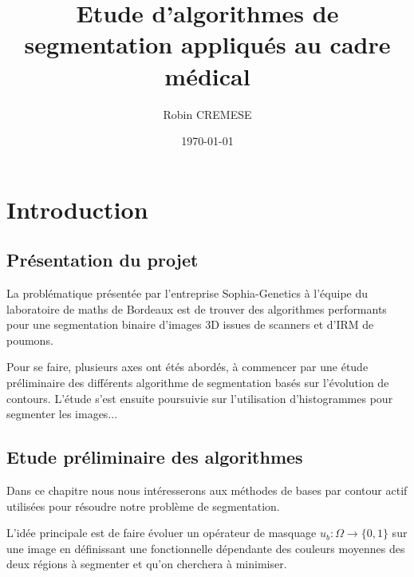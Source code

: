 \documentclass{report}
\title{Etude d'algorithmes de segmentation appliqués au cadre médical}
\author{Robin CREMESE}
\date{\today}
\begin{document}
\layout
\part{Introduction}
\label{P-Introduction}
\chapter{Présentation du projet}
\label{C-Présentation du projet}
La problématique présentée par l'entreprise Sophia-Genetics à l'équipe du laboratoire de maths de Bordeaux est de trouver des algorithmes performants pour une segmentation binaire d'images 3D issues de scanners et d'IRM de poumons.

Pour se faire, plusieurs axes ont étés abordés, à commencer par une étude préliminaire des différents  algorithme de segmentation basés sur l'évolution de contours. L'étude s'est ensuite poursuivie sur l'utilisation d'histogrammes pour segmenter les images...

\chapter{Etude préliminaire des algorithmes}
\label{C-Etude préliminaire des algorithmes}
Dans ce chapitre nous nous intéresserons aux méthodes de bases par contour actif utilisées pour résoudre notre problème de segmentation.

L'idée principale est de faire évoluer un opérateur de masquage $u_b:\Omega \rightarrow \{0,1\}$ sur une image en définissant une fonctionnelle dépendante des couleurs moyennes des deux régions à segmenter et qu'on cherchera à minimiser.
\end{document}
